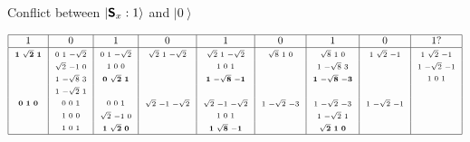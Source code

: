 \documentclass[11pt, a4paper]{article}
\theoremstyle{definition}
\newcommand{\ket}[1]{\left| #1 \right>}
\newcommand{\proj}[3]{\begin{smallmatrix} #1 & #2 & #3 \end{smallmatrix}}
\newcommand{\projbf}[3]{\begin{smallmatrix} \mathbf{#1} & \mathbf{#2} & \mathbf{#3} \end{smallmatrix}}
\begin{document}
\begin{table}[h!]
\vspace{-12pt}
\caption{Conflict between $\ket{\textsf{\textbf{S}}_x : 1}$ and $\ket{0}$}
\vspace{-36pt}
\label{tab:1}
$$\begin{array}[t]{|c|c|c|c|c|c|c|c|c|}
\hline
1 & 0 & 1 & 0 & 1 & 0 & 1 & 0 & 1? \\
\hline
\projbf{1}{\sqrt{2}}{1} & \proj{0}{1}{-\sqrt{2}} & \proj{0}{1}{-\sqrt{2}} & \proj{\sqrt{2}}{1}{-\sqrt{2}} & \proj{\sqrt{2}}{1}{-\sqrt{2}} & \proj{\sqrt{8}}{1}{0} & \proj{\sqrt{8}}{1}{0} & \proj{1}{\sqrt{2}}{-1} & \proj{1}{\sqrt{2}}{-1} \\
~ & \proj{\sqrt{2}}{-1}{0} & \proj{1}{0}{0} & ~ & \proj{1}{0}{1} & ~ & \proj{1}{-\sqrt{8}}{3} & ~ & \proj{1}{-\sqrt{2}}{-1} \\
~ & \proj{1}{-\sqrt{8}}{3} & \projbf{0}{\sqrt{2}}{1} & ~ & \projbf{1}{-\sqrt{8}}{-1} & ~ & \projbf{1}{-\sqrt{8}}{-3} & ~ & \proj{1}{0}{1} \\
~ & \proj{1}{-\sqrt{2}}{1} & ~ & ~ & ~ & ~ & ~ & ~ & ~ \\
\projbf{0}{1}{0} & \proj{0}{0}{1} & \proj{0}{0}{1} & \proj{\sqrt{2}}{-1}{-\sqrt{2}} & \proj{\sqrt{2}}{-1}{-\sqrt{2}} & \proj{1}{-\sqrt{2}}{-3} & \proj{1}{-\sqrt{2}}{-3} & \proj{1}{-\sqrt{2}}{-1} & ~ \\
~ & \proj{1}{0}{0} & \proj{\sqrt{2}}{-1}{0} & ~ & \proj{1}{0}{1} & ~ & \proj{1}{-\sqrt{2}}{1} & ~ & ~ \\
~ & \proj{1}{0}{1} & \projbf{1}{\sqrt{2}}{0} & ~ & \projbf{1}{\sqrt{8}}{-1} & ~ & \projbf{\sqrt{2}}{1}{0} & ~ & ~ \\
\hline
\end{array}$$
\vspace{-12pt}
\end{table}
\end{document}
